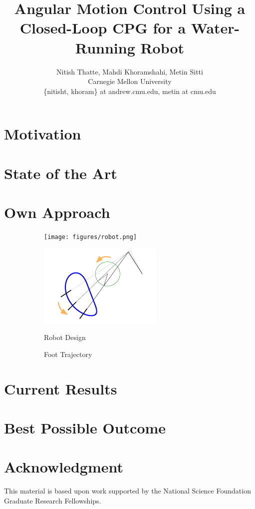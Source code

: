 \documentclass[letterpaper,twocolumn]{article}
\title{\large \textbf{Angular Motion Control Using a Closed-Loop CPG for a Water-Running Robot}}
\author{\small Nitish Thatte, Mahdi Khoramshahi, Metin Sitti \\
        \small Carnegie Mellon University \\
        \small \{nitisht, khoram\} at andrew.cmu.edu, metin at cmu.edu
}
\date{}
\begin{document}
\maketitle
\section{Motivation}


\section{State of the Art}


\section{Own Approach}


\begin{figure}[tb]
	\centering
	\begin{subfigure}[c]{0.24\textwidth}
		\centering
		\texttt{[image: figures/robot.png]}
	\end{subfigure}
	\begin{subfigure}[c]{0.24\textwidth}
		\centering
		\includegraphics[width = \textwidth]{figures/traj.pdf}
	\end{subfigure}

	\begin{subfigure}[c]{0.24\textwidth}
		\caption{Robot Design}
		\label{fig:robot}
	\end{subfigure}
	\begin{subfigure}[c]{0.24\textwidth}
		\caption{Foot Trajectory}
		\label{fig:traj}
	\end{subfigure}
	\vspace{-0.25in}
	\caption{}
	\vspace{-0.15in}
\end{figure}

\section{Current Results}


\section{Best Possible Outcome}


\section*{Acknowledgment}
This material is based upon work supported by the National Science Foundation Graduate Research Fellowships. 



\end{document}
